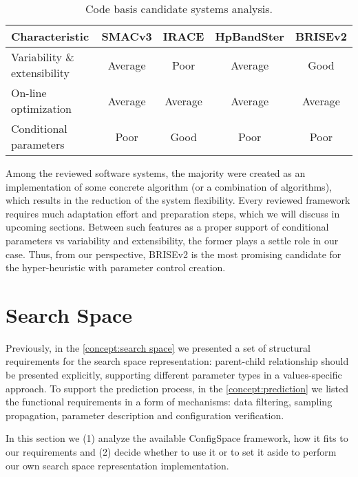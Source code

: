 \begin{table}[h!]
	\centering
	\begin{tabular}{l||cccc}
		\textbf{Characteristic} & \textbf{SMACv3}& \textbf{IRACE} & \textbf{HpBandSter} & \textbf{BRISEv2} \\
		\hline
		\hline
		Variability \& extensibility & \cellcolor{yellow!25}Average & \cellcolor{red!25}Poor & \cellcolor{yellow!25}Average & \cellcolor{green!25}Good \\
	
		On-line optimization & \cellcolor{yellow!25}Average & \cellcolor{yellow!25}Average & \cellcolor{yellow!25}Average & \cellcolor{yellow!25}Average \\
	
		Conditional parameters & \cellcolor{red!25}Poor & \cellcolor{green!25}Good & \cellcolor{red!25}Poor & \cellcolor{red!25}Poor \\
	\end{tabular}
	\caption{Code basis candidate systems analysis.}
	\label{iml: table code basis selection}
\end{table}

Among the reviewed software systems, the majority were created as an implementation of some concrete algorithm (or a combination of algorithms), which results in the reduction of the system flexibility. Every reviewed framework requires much adaptation effort and preparation steps, which we will discuss in upcoming sections. Between such features as a proper support of conditional parameters vs variability and extensibility, the former plays a settle role in our case. Thus, from our perspective, BRISEv2 is the most promising candidate for the hyper-heuristic with parameter control creation.

\section{Search Space}\label{impl: search space}
Previously, in the \cref{concept:search space} we presented a set of structural requirements for the search space representation: parent-child relationship should be presented explicitly, supporting different parameter types in a values-specific approach. To support the prediction process, in the \cref{concept:prediction} we listed the functional requirements in a form of mechanisms: data filtering, sampling propagation, parameter description and configuration verification.

In this section we (1) analyze the available ConfigSpace framework, how it fits to our requirements and (2) decide whether to use it or to set it aside to perform our own search space representation implementation.

